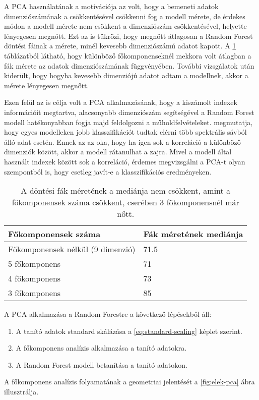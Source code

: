 A PCA használatának a motivációja az volt, hogy a bemeneti adatok dimenziószámának a csökkentésével csökkenni fog a modell mérete, de érdekes módon a modell mérete nem csökkent a dimenziószám csökkentésével, helyette lényegesen megnőtt. Ezt az is tükrözi, hogy megnőtt átlagosan a Random Forest döntési fáinak a mérete, minél kevesebb dimenziószámú adatot kapott. A \ref{tab:increase-in-model-size} táblázatból látható, hogy különböző főkomponenseknél mekkora volt átlagban a fák mérete az adatok dimenziószámának függvényében. További vizsgálatok után kiderült, hogy hogyha kevesebb dimenziójú adatot adtam a modellnek, akkor a mérete lényegesen megnőtt. 

Ezen felül az is célja volt a PCA alkalmazásának, hogy a kiszámolt indexek információit megtartva, alacsonyabb dimenziószám segítségével a Random Forest modell hatékonyabban fogja majd feldolgozni a műholdfelvételeket. \cite{Howley2005} megmutatja, hogy egyes modelleken jobb klasszifikációt tudtak elérni több spektrális sávból álló adat esetén. Ennek az az oka, hogy ha igen sok a korreláció a különböző dimenziók között, akkor a modell rátanulhat a zajra. Mivel a modell által használt indexek között sok a korreláció, érdemes megvizsgálni a PCA-t olyan szempontból is, hogy esetleg javít-e a klasszifikációs eredményeken. 

\begin{table}[H]
	\centering
	\begin{tabular}{ | p{} | p{} | }
		\hline
		\textbf{Főkomponensek száma} & \textbf{Fák méretének mediánja} \\
		\hline \hline
		Főkomponensek nélkül (9 dimenzió) & 71.5 \\
		\hline
    5 főkomponens & 71 \\
		\hline
		4 főkomponens & 73\\
		\hline
    3 főkomponens & 85 \\
    \hline
	\end{tabular}
	\caption{A döntési fák méretének a mediánja nem csökkent, amint a főkomponensek száma csökkent, cserében 3 főkomponensnél már nőtt.}
	\label{tab:increase-in-model-size}
\end{table}

A PCA alkalmazása a Random Forestre a következő lépésekből áll:
\begin{enumerate}
	\item A tanító adatok standard skálázása a \ref{eq:standard-scaling} képlet szerint.
	\item A főkomponens analízis alkalmazása a tanító adatokra.
	\item A Random Forest modell betanítása a tanító adatokon.
\end{enumerate}
A főkomponens analízis folyamatának a geometriai jelentését a \ref{fig:elek-pca} ábra illusztrálja.

